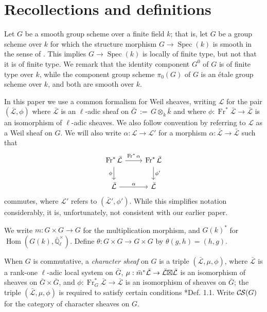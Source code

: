 \documentclass[10pt]{amsart}
\theoremstyle{plain}
\theoremstyle{definition}
\newcommand{\EE}{\mathbb{\bar Q}_\ell}
\newcommand{\bFq}{\bar{k}}
\newcommand{\Fq}{k}
\newcommand{\EEx}{\EE^\times}
\newcommand{\Frob}[1]{\operatorname{Fr}_{#1}}
\DeclareMathOperator{\Hom}{Hom}
\newcommand{\Spec}[1]{{\operatorname{Spec}(#1)}}
\newcommand{\ceq}{{\, :=\, }}
\newcommand{\cs}[1]{{\mathcal{#1}}}
\newcommand{\gcs}[1]{{\mathcal{\bar #1}}}
\newcommand{\CS}{{\mathcal{C\hskip-0.8pt S}}}
\newcommand{\bm}{\bar{m}}
\newcommand{\bG}{\bar{G}}
\newcommand{\tight}[3]{\hspace{-#1pt}{#2}\hspace{-#3pt}}
\newcommand{\LxL}{\text{$\gcs{L} \tight{0}{\boxtimes}{0} \gcs{L}$}}
\begin{document}

\section{Recollections and definitions} \label{sec:defs}

Let $G$ be a smooth group scheme over a finite field $\Fq$; that is, let $G$ be a group scheme over $\Fq$
for which the structure morphism $G \to \Spec{\Fq}$ is smooth in the sense of .
This implies $G \to \Spec{\Fq}$ is locally of finite type, but not that it is of finite type.
We remark that the identity component $G^0$ of $G$ is of finite type over $\Fq$, while the component group scheme
$\pi_0(G)$ of $G$ is an \'etale group scheme over $\Fq$, and both are smooth over $\Fq$.

In this paper we use a common formalism for Weil sheaves, writing $\cs{L}$ for the pair $(\gcs{L},\phi)$ where $\gcs{L}$ is an $\ell$-adic sheaf on $\bG \ceq G\otimes_{\Fq} \bFq$ and where $\phi : \Frob{}^*\gcs{L} \to \gcs{L}$ is an isomorphism of $\ell$-adic sheaves. 
We also follow convention by referring to $\cs{L}$  as a Weil sheaf on $G$. 
We will also write $\alpha : \cs{L} \to \cs{L}'$ for a morphism $\alpha : \gcs{L} \to \gcs{L}$ such that 
\[
\begin{tikzcd}
\Frob{}^* \gcs{L} \arrow{d}[swap]{\phi} \arrow{r}{\Frob{}^*\alpha} &  \Frob{}^* \gcs{L} \arrow{d}{\phi'}\\
\gcs{L} \arrow{r}{\alpha} & \gcs{L}
\end{tikzcd}
\]
commutes, where $\cs{L}'$ refers to $(\gcs{L}',\phi')$.
While this simplifies notation considerably, it is, unfortunately, not consistent with our earlier paper.

We write $m : G \times G \to G$ for the multiplication morphism, and $G(k)^*$ for $\Hom(G(k), \EEx)$.
Define $\theta : G\times G \to G\times G$ by $\theta(g,h) = (h,g)$.

When $G$ is commutative, a \emph{character sheaf} on $G$ is a triple $(\gcs{L}, \mu, \phi)$,
where $\gcs{L}$ is a rank-one $\ell$-adic local system on $\bG$, 
$\mu : \bm^* \gcs{L} \to \LxL$ is an isomorphism
of sheaves on $\bG \times \bG$, 
and $\phi : \Frob{G}^* \gcs{L} \to \gcs{L}$ is an isomorphism of sheaves on $\bG$;
the triple $(\gcs{L}, \mu, \phi)$ is required to satisfy certain conditions \cite{cunningham-roe:13a}*{Def. 1.1}.
Write $\CS(G)$ for the category of character sheaves on $G$.
\end{document}
